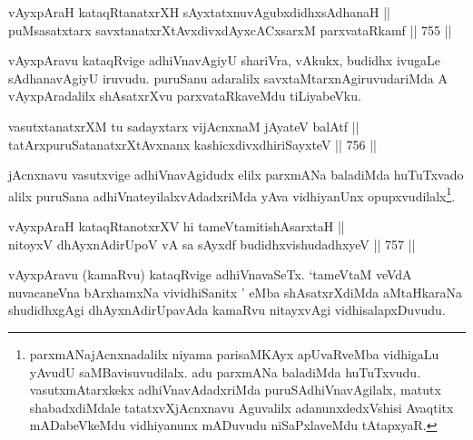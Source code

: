\begin{shl}
vAyxpAraH kataqRtanatxrXH sAyxtatxnuvAgubxdidhxsAdhanaH || \\
puMsasatxtarx savxtanatxrXtAvxdivxdAyxcACxsarxM parxvataRkamf \hfill || 755 ||  
\end{shl}

\begin{artha} 
vAyxpAravu kataqRvige adhiVnavAgiyU shariVra, vAkukx, budidhx ivugaLe 
sAdhanavAgiyU iruvudu. puruSanu adaralilx savxtaMtarxnAgiruvudariMda A 
vAyxpAradalilx shAsatxrXvu parxvataRkaveMdu tiLiyabeVku.
\end{artha}

\begin{shl}
vasutxtanatxrXM tu sadayxtarx vijAcnxnaM jAyateV balAtf || \\
tatArxpuruSatanatxrXtAvxnanx kashicxdivxdhiriSayxteV \hfill || 756 ||  
\end{shl}

\begin{artha} 
jAcnxnavu vasutxvige adhiVnavAgidudx elilx parxmANa baladiMda 
huTuTxvado alilx puruSana adhiVnateyilalxvAdadxriMda yAva vidhiyanUnx 
opupxvudilalx\footnote{parxmANajAcnxnadalilx niyama parisaMKAyx 
apUvaRveMba vidhigaLu yAvudU saMBavisuvudilalx. adu parxmANa baladiMda 
huTuTxvudu. vasutxmAtarxkekx adhiVnavAdadxriMda puruSAdhiVnavAgilalx, 
matutx shabadxdiMdale tatatxvXjAcnxnavu Aguvalilx adanunxdedxVshisi 
Avaqtitx mADabeVkeMdu vidhiyanunx mADuvudu niSaPxlaveMdu tAtapxyaR.}.
\end{artha}


\begin{shl}
\footnotemark[2]vAyxpAraH kataqRtanotxrXV hi tameVtamitishAsarxtaH || \\
nitoyxV dhAyxnAdirUpoV vA sa sAyxdf budidhxvishudadhxyeV \hfill || 757 ||  
\end{shl}

\begin{artha} 
vAyxpAravu (kamaRvu) kataqRvige adhiVnavaSeTx. `tameVtaM veVdA nuvacaneVna bArxhamxNa vividhiSanitx ' eMba 
shAsatxrXdiMda aMtaHkaraNa shudidhxgAgi dhAyxnAdirUpavAda kamaRvu 
nitayxvAgi vidhisalapxDuvudu.
\end{artha}

